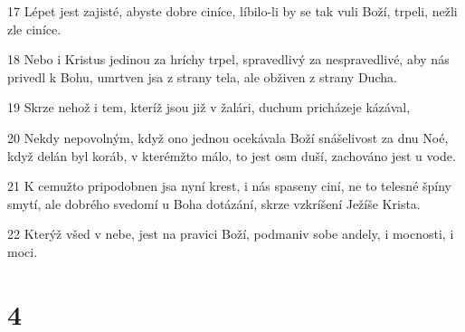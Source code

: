 \par 17 Lépet jest zajisté, abyste dobre ciníce, líbilo-li by se tak vuli Boží, trpeli, nežli zle ciníce.
\par 18 Nebo i Kristus jedinou za hríchy trpel, spravedlivý za nespravedlivé, aby nás privedl k Bohu, umrtven jsa z strany tela, ale obživen z strany Ducha.
\par 19 Skrze nehož i tem, kteríž jsou již v žalári, duchum pricházeje kázával,
\par 20 Nekdy nepovolným, když ono jednou ocekávala Boží snášelivost za dnu Noé, když delán byl koráb, v kterémžto málo, to jest osm duší, zachováno jest u vode.
\par 21 K cemužto pripodobnen jsa nyní krest, i nás spaseny ciní, ne to telesné špíny smytí, ale dobrého svedomí u Boha dotázání, skrze vzkríšení Ježíše Krista.
\par 22 Kterýž všed v nebe, jest na pravici Boží, podmaniv sobe andely, i mocnosti, i moci.

\chapter{4}

